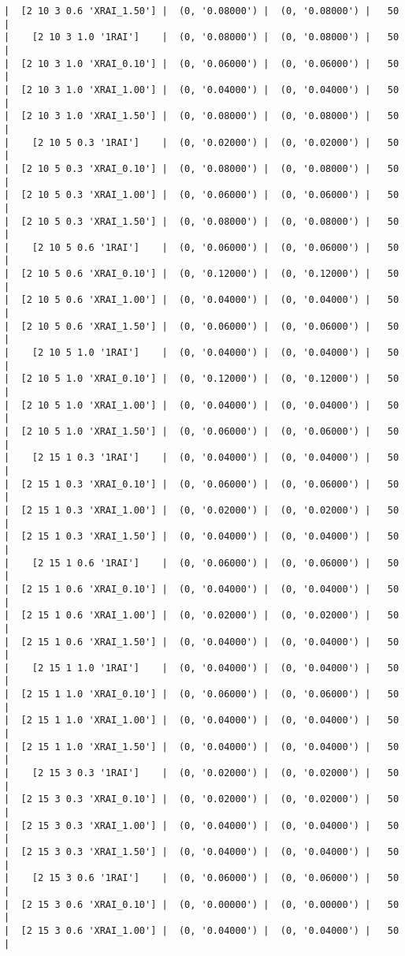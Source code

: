 \documentclass{article}
\begin{document}
\begin{verbatim}
|  [2 10 3 0.6 'XRAI_1.50'] |  (0, '0.08000') |  (0, '0.08000') |   50  |
|    [2 10 3 1.0 '1RAI']    |  (0, '0.08000') |  (0, '0.08000') |   50  |
|  [2 10 3 1.0 'XRAI_0.10'] |  (0, '0.06000') |  (0, '0.06000') |   50  |
|  [2 10 3 1.0 'XRAI_1.00'] |  (0, '0.04000') |  (0, '0.04000') |   50  |
|  [2 10 3 1.0 'XRAI_1.50'] |  (0, '0.08000') |  (0, '0.08000') |   50  |
|    [2 10 5 0.3 '1RAI']    |  (0, '0.02000') |  (0, '0.02000') |   50  |
|  [2 10 5 0.3 'XRAI_0.10'] |  (0, '0.08000') |  (0, '0.08000') |   50  |
|  [2 10 5 0.3 'XRAI_1.00'] |  (0, '0.06000') |  (0, '0.06000') |   50  |
|  [2 10 5 0.3 'XRAI_1.50'] |  (0, '0.08000') |  (0, '0.08000') |   50  |
|    [2 10 5 0.6 '1RAI']    |  (0, '0.06000') |  (0, '0.06000') |   50  |
|  [2 10 5 0.6 'XRAI_0.10'] |  (0, '0.12000') |  (0, '0.12000') |   50  |
|  [2 10 5 0.6 'XRAI_1.00'] |  (0, '0.04000') |  (0, '0.04000') |   50  |
|  [2 10 5 0.6 'XRAI_1.50'] |  (0, '0.06000') |  (0, '0.06000') |   50  |
|    [2 10 5 1.0 '1RAI']    |  (0, '0.04000') |  (0, '0.04000') |   50  |
|  [2 10 5 1.0 'XRAI_0.10'] |  (0, '0.12000') |  (0, '0.12000') |   50  |
|  [2 10 5 1.0 'XRAI_1.00'] |  (0, '0.04000') |  (0, '0.04000') |   50  |
|  [2 10 5 1.0 'XRAI_1.50'] |  (0, '0.06000') |  (0, '0.06000') |   50  |
|    [2 15 1 0.3 '1RAI']    |  (0, '0.04000') |  (0, '0.04000') |   50  |
|  [2 15 1 0.3 'XRAI_0.10'] |  (0, '0.06000') |  (0, '0.06000') |   50  |
|  [2 15 1 0.3 'XRAI_1.00'] |  (0, '0.02000') |  (0, '0.02000') |   50  |
|  [2 15 1 0.3 'XRAI_1.50'] |  (0, '0.04000') |  (0, '0.04000') |   50  |
|    [2 15 1 0.6 '1RAI']    |  (0, '0.06000') |  (0, '0.06000') |   50  |
|  [2 15 1 0.6 'XRAI_0.10'] |  (0, '0.04000') |  (0, '0.04000') |   50  |
|  [2 15 1 0.6 'XRAI_1.00'] |  (0, '0.02000') |  (0, '0.02000') |   50  |
|  [2 15 1 0.6 'XRAI_1.50'] |  (0, '0.04000') |  (0, '0.04000') |   50  |
|    [2 15 1 1.0 '1RAI']    |  (0, '0.04000') |  (0, '0.04000') |   50  |
|  [2 15 1 1.0 'XRAI_0.10'] |  (0, '0.06000') |  (0, '0.06000') |   50  |
|  [2 15 1 1.0 'XRAI_1.00'] |  (0, '0.04000') |  (0, '0.04000') |   50  |
|  [2 15 1 1.0 'XRAI_1.50'] |  (0, '0.04000') |  (0, '0.04000') |   50  |
|    [2 15 3 0.3 '1RAI']    |  (0, '0.02000') |  (0, '0.02000') |   50  |
|  [2 15 3 0.3 'XRAI_0.10'] |  (0, '0.02000') |  (0, '0.02000') |   50  |
|  [2 15 3 0.3 'XRAI_1.00'] |  (0, '0.04000') |  (0, '0.04000') |   50  |
|  [2 15 3 0.3 'XRAI_1.50'] |  (0, '0.04000') |  (0, '0.04000') |   50  |
|    [2 15 3 0.6 '1RAI']    |  (0, '0.06000') |  (0, '0.06000') |   50  |
|  [2 15 3 0.6 'XRAI_0.10'] |  (0, '0.00000') |  (0, '0.00000') |   50  |
|  [2 15 3 0.6 'XRAI_1.00'] |  (0, '0.04000') |  (0, '0.04000') |   50  |

\end{verbatim}
\end{document}
